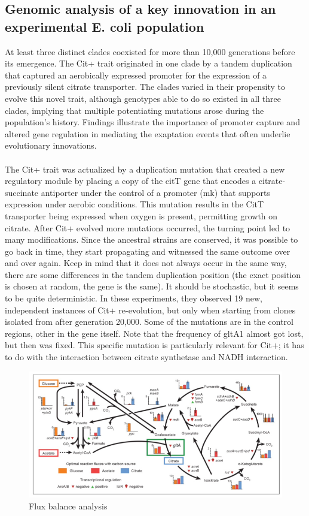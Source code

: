 \subsection{Genomic analysis of a key innovation in an experimental E. coli population}
At least three distinct clades coexisted for more than 10,000 generations before its emergence. The Cit+ trait originated in one clade by a tandem duplication that captured an aerobically expressed promoter for the expression of a previously silent citrate transporter. The clades varied in their propensity to evolve this novel trait, although genotypes able to do so existed in all three clades, implying that multiple potentiating mutations arose during the population’s history. Findings illustrate the importance of promoter capture and altered gene regulation in mediating the exaptation events that often underlie evolutionary innovations. 
\\
\\
\noindent
The Cit+ trait was actualized by a duplication mutation that created a new regulatory module by placing a copy of the citT gene that encodes a citrate-succinate antiporter under the control of a promoter (mk) that supports expression under aerobic conditions. This mutation results in the CitT transporter being expressed when oxygen is present, permitting growth on citrate. 
After Cit+ evolved more mutations occurred, the turning point led to many modifications. Since the ancestral strains are conserved, it was possible to go back in time, they start propagating and witnessed the same outcome over and over again. Keep in mind that it does not always occur in the same way, there are some differences in the tandem duplication position (the exact position is chosen at random, the gene is the same). It should be stochastic, but it seems to be quite deterministic. In these experiments, they observed 19 new, independent instances of Cit+ re-evolution, but only when starting from clones isolated from after generation 20,000. 
Some of the mutations are in the control regions, other in the gene itself. Note that the frequency of gltA1 almost got lost, but then was fixed. This specific mutation is particularly relevant for Cit+; it has to do with the interaction between citrate synthetase and NADH interaction. 

\begin{figure}[h]
\includegraphics[width=1\textwidth, center]{flux_balance_analysis}
\caption{\label{fig:flux_an} Flux balance analysis}
\end{figure}

